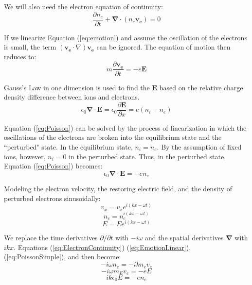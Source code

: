 \documentclass[twocolumn]{article}
\begin{document}
We will also need the electron equation of continuity:
\begin{equation}
	\frac{\partial n_e}{\partial t} + \mathbf{\nabla} \cdot (n_e \mathbf{v_e}) = 0
	\label{eq:ElectronContinuity}
\end{equation}

If we linearize Equation (\ref{eq:emotion}) and assume the oscillation of the electrons is small, the term $\left(\mathbf{v_e} \cdot \nabla \right) \mathbf{v_e}$ can be ignored.
The equation of motion then reduces to:
\begin{equation}
	m \frac{\partial \mathbf{v_e}}{\partial t} = -e \mathbf{E}
	\label{eq:EmotionLinear}
\end{equation}

Gauss's Law in one dimension is used to find the $\mathbf{E}$ based on the relative charge density difference between ions and electrons.
\begin{equation} 
	\epsilon_0 \mathbf{\nabla \cdot E} = \epsilon_0 \frac{\partial\mathbf{E}}{\partial x} = e(n_i - n_e)
	\label{eq:Poisson}
\end{equation}

Equation (\ref{eq:Poisson}) can be solved by the process of linearization in which the oscillations of the electrons are broken into the equilibrium state and the ``perturbed" state.
In the equilibrium state, $n_i = n_e$.
By the assumption of fixed ions, however, $n_i = 0$ in the perturbed state.
Thus, in the perturbed state, Equation (\ref{eq:Poisson}) becomes:
\begin{equation}
	\epsilon_0\mathbf{\nabla \cdot E} = -en_e
	\label{eq:PoissonSimple}
\end{equation}

Modeling the electron velocity, the restoring electric field, and the density of perturbed electrons sinusoidally:
\begin{equation*}
	v_x = v_xe^{i(kx - \omega t)}
\end{equation*}
\begin{equation*}
	n_e = n_e^{i(kx-\omega t)}
\end{equation*}
\begin{equation*}
	E = Ee^{i(kx-\omega t)}
\end{equation*}

We replace the time derivatives $\partial/\partial t$ with $-i\omega$ and the spatial derivatives $\mathbf{\nabla}$ with $ikx$.
Equations (\ref{eq:ElectronContinuity}) (\ref{eq:EmotionLinear}), (\ref{eq:PoissonSimple}), and  then become:
\begin{equation*}
	-i\omega n_e = -ikn_ev_e
\end{equation*}
\begin{equation*}
	-i\omega m_E v_e= -eE
\end{equation*}
\begin{equation*}
	ik\epsilon_0E = -en_e
\end{equation*}
\end{document}
